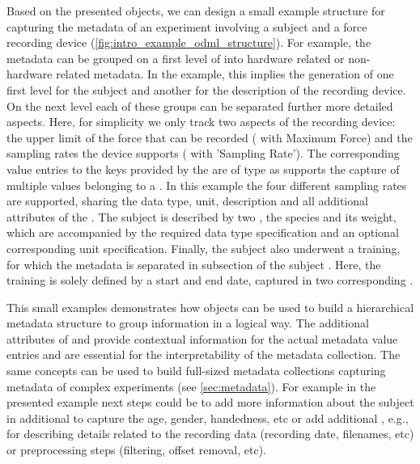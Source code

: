 Based on the presented  objects, we can design a small example structure for capturing the metadata of an experiment involving a subject and a force recording device (\cref{fig:intro_example_odml_structure}). For example, the metadata can be grouped on a first level of  into hardware related or non-hardware related metadata. In the example, this implies the generation of one first level  for the subject and another  for the description of the recording device. On the next level each of these groups can be separated further more detailed aspects. Here, for simplicity we only track two aspects of the recording device: the upper limit of the force that can be recorded ( with  Maximum Force) and the sampling rates the device supports ( with  'Sampling Rate'). The corresponding value entries to the keys provided by the  are of type  as  supports the capture of multiple values belonging to a . In this example the four different sampling rates are supported, sharing the data type, unit, description and all additional attributes of the . The subject is described by two , the species and its weight, which are accompanied by the required data type specification and an optional corresponding unit specification. Finally, the subject also underwent a training, for which the metadata is separated in subsection of the subject . Here, the training is solely defined by a start and end date, captured in two corresponding .

This small examples demonstrates how  objects can be used to build a hierarchical metadata structure to group information in a logical way. The additional attributes of  and  provide contextual information for the actual metadata value entries and are essential for the interpretability of the metadata collection. The same concepts can be used to build full-sized metadata collections capturing metadata of complex experiments (see \cref{sec:metadata}). For example in the presented example next steps could be to add more information about the subject in additional  to capture the age, gender, handedness, etc or add additional , e.g., for describing details related to the recording data (recording date, filenames, etc) or preprocessing steps (filtering, offset removal, etc).




